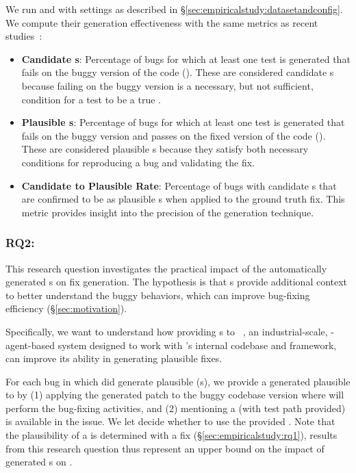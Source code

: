 We run \libro and \tool with settings as described in \S\ref{sec:empiricalstudy:datasetandconfig}.
We compute their \brt generation effectiveness with the same metrics as recent studies~\cite{mundler2024swt,kang2023large}:

\begin{itemize}
    \item \textbf{Candidate \brt{}s}: Percentage of bugs for which at least one test is generated that fails on the buggy version of the code (\failtoany). 
    These are considered candidate \brt{}s because failing on the buggy version is a necessary, but not sufficient, condition for a test to be a true \brt.
    \item \textbf{Plausible \brt{}s}: Percentage of bugs for which at least one test is generated that fails on the buggy version and passes on the fixed version of the code (\failtopass). 
    These are considered plausible \brt{}s because they satisfy both necessary conditions for reproducing a bug and validating the fix.
    \item \textbf{Candidate to Plausible \brt Rate}: Percentage of bugs with candidate \brt{}s that are confirmed to be as plausible \brt{}s when applied to the ground truth fix. 
    This metric provides insight into the precision of the \brt generation technique.
\end{itemize}



\subsubsection{RQ2: \rqtwotitle}
\label{sec:empiricalstudy:rq2}

This research question investigates the practical impact of the automatically generated \brt{}s on fix generation. 
The hypothesis is that \brt{}s provide additional context to better understand the buggy behaviors, which can improve bug-fixing efficiency (\S\ref{sec:motivation}).

Specifically, we want to understand how providing \brt{}s to \passerine~\cite{rondon2025passerine}, an industrial-scale, \llm-agent-based \autopr system designed to work with \google's internal codebase and framework, can improve its ability in generating plausible fixes. 


For each bug in which \tool did generate plausible \brt{}(s), we provide a generated plausible \brt{} to \passerine by (1) applying the generated \brt patch to the buggy codebase version where \passerine will perform the bug-fixing activities, and (2) mentioning a \brt (with test path provided) is available in the \gits issue.
We let \passerine decide whether to use the provided \brt{}.
Note that the plausibility of a \brt is determined with a fix (\S\ref{sec:empiricalstudy:rq1}), results from this research question thus represent an upper bound on the impact of generated \brt{}s on \autopr{}.



